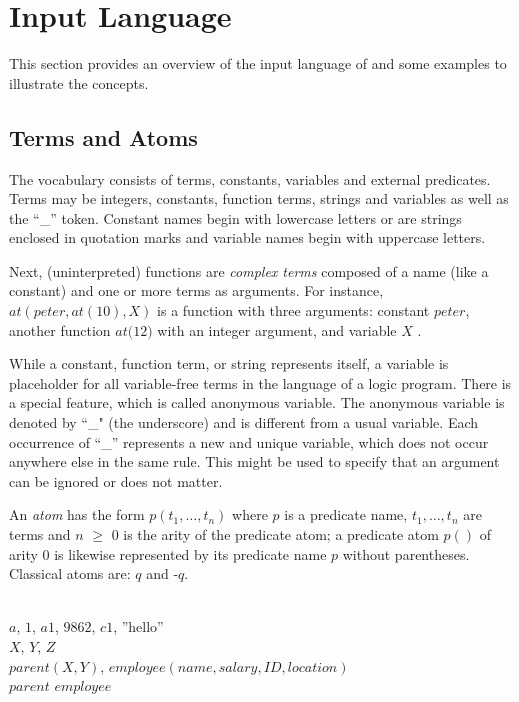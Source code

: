 \documentclass[a4paper, titlepage]{article}
\begin{document}
\section{Input Language}%
\label{sec:inputLang}
This section provides an overview of the input language of 
\dlvhex{} and some examples to illustrate the concepts. 

\subsection{Terms and Atoms}
The vocabulary consists of terms, constants, variables and 
external predicates. Terms may be integers, constants, function terms, 
strings and variables as well as the \enquote{\_} token. 
Constant names begin with lowercase letters or are strings 
enclosed in quotation marks and variable names begin with 
uppercase letters.

Next, (uninterpreted) functions are \emph{complex terms} composed of a name
(like a constant) and one or more terms as arguments.
For instance,
$\mathit{at(peter,at(10),X)}$ is a function with three arguments: constant $\mathit{peter}$,
another function $\mathit{at(12})$ with an integer argument, and variable $X$ \cite{gkklorst2015}.

While a constant, function term, or string represents itself, a variable is 
placeholder for all variable-free terms in the language of 
a logic program. There is a special feature, which is 
called anonymous variable. The anonymous variable is 
denoted by ``\_" (the underscore) and is different from a 
usual variable. Each occurrence of \enquote{\_} represents 
a new and unique variable, which does not occur anywhere 
else in the same rule. This might be used to specify that 
an argument can be ignored or does not matter.

An \emph{atom} has the form $\mathit{p(t_1,\dots,t_n)}$ where 
$p$ is a predicate name, $t_1,\dots,t_n$ are terms and $n$ 
$\geq$ $0$ is the arity of the predicate atom; a predicate 
atom $p()$ of arity 0 is likewise represented by its 
predicate name $p$ without parentheses. Classical atoms 
are: $q$ and -$q$.
\begin{exmp}
\text{   }
\\  $a$, $1$, $\mathit{a1}$, 
$\mathit{9862}$, $\mathit{c1}$, ''hello''
\\  $X$, $Y$, $Z$
\\  $\mathit{parent}(X,Y)$, $\mathit{employee}
(name, salary, ID, location)$
\\  $\mathit{parent}$ $\mathit{employee}$
\end{exmp}
\end{document}
